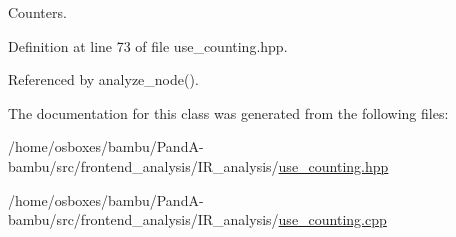 Counters. 



Definition at line 73 of file use\+\_\+counting.\+hpp.



Referenced by analyze\+\_\+node().



The documentation for this class was generated from the following files\+:\begin{DoxyCompactItemize}
\item 
/home/osboxes/bambu/\+Pand\+A-\/bambu/src/frontend\+\_\+analysis/\+I\+R\+\_\+analysis/\hyperlink{use__counting_8hpp}{use\+\_\+counting.\+hpp}\item 
/home/osboxes/bambu/\+Pand\+A-\/bambu/src/frontend\+\_\+analysis/\+I\+R\+\_\+analysis/\hyperlink{use__counting_8cpp}{use\+\_\+counting.\+cpp}\end{DoxyCompactItemize}
